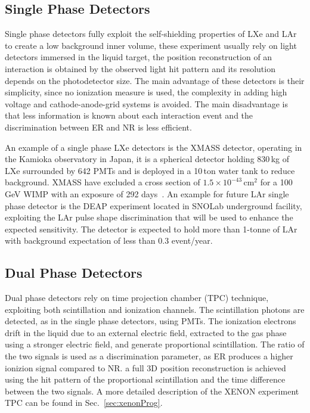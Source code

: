 \subsection{Single Phase Detectors}
\label{sec:singlePhase}
 
Single phase detectors fully exploit the self-shielding properties of LXe and LAr to create a low background inner volume, these experiment usually rely on light detectors immersed in the liquid target, the position reconstruction of an interaction is obtained by the observed light hit pattern and its resolution depends on the photodetector size. The main advantage of these detectors is their simplicity, since no ionization measure is used, the complexity in adding high voltage and cathode-anode-grid systems is avoided. The main disadvantage is that less information is known about each interaction event and the discrimination between ER and NR is less efficient. 

An example of a single phase LXe detectors is the XMASS detector, operating in the Kamioka observatory in Japan, it is a spherical detector holding 830\,kg of LXe surrounded by 642 PMTs and is deployed in a 10\,ton water tank to reduce background. XMASS have excluded a cross section of $1.5\times 10^{-43}$\,cm$^2$ for a 100\,GeV WIMP with an exposure of 292 days~\cite{Hiraide:2016ryf}. An example for future LAr single phase detector is the DEAP experiment located in SNOLab underground facility, exploiting the LAr pulse shape discrimination that will be used to enhance the expected sensitivity. The detector is expected to hold more than 1-tonne of LAr with background expectation of less than $0.3$ event/year. 
 
\subsection{Dual Phase Detectors}
\label{sec:dualPhase}

Dual phase detectors rely on time projection chamber (TPC) technique, exploiting both scintillation and ionization channels. The scintillation photons are detected, as in the single phase detectors, using PMTs. The ionization electrons drift in the liquid due to an external electric field, extracted to the gas phase using a stronger electric field, and generate proportional scintillation. The ratio of the two signals is used as a discrimination parameter, as ER produces a higher ionizion signal compared to NR. a full 3D position reconstruction is achieved using the hit pattern of the proportional scintillation and the time difference between the two signals. A more detailed description of the XENON experiment TPC can be found in Sec.~\ref{sec:xenonProg}.

